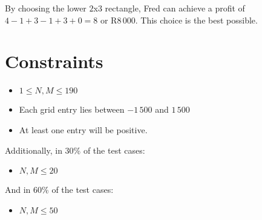 \documentclass{saco}
\begin{document}
By choosing the lower $2$x$3$ rectangle, Fred can achieve a profit of $4-1+3-1+3+0 = 8$ or $\mathrm{R}8\,000$.
This choice is the best possible.


\sampleinput

\outputformat

\sampleoutput


\section{Constraints}
%
\begin{itemize}
\item $1 \le N,M \le 190$
\item Each grid entry lies between $-1\,500$ and $1\,500$
\item At least one entry will be positive.
\end{itemize}

Additionally, in 30\% of the test cases:
\begin{itemize}
\item $N,M \le 20$
\end{itemize}

And in 60\% of the test cases:
\begin{itemize}
\item $N,M \le 50$
\end{itemize}
\end{document}
